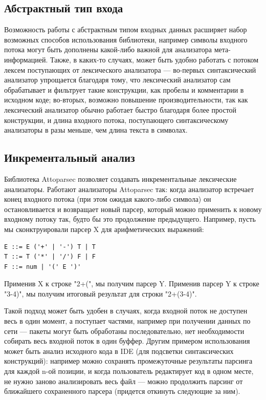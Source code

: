 \documentclass[14pt]{matmex-diploma}
\begin{document}
\subsection{Абстрактный тип входа}

Возможность работы с абстрактным типом входных данных расширяет набор возможных способов использования библиотеки, 
например символы входного потока могут быть дополнены какой-либо важной для анализатора мета-информацией.
Также, в каких-то случаях, может быть удобно работать с потоком лексем поступающих от лексического анализатора --- 
во-первых синтаксический анализатор упрощается благодаря тому,
что лексический анализатор сам обрабатывает и фильтрует такие конструкции, 
как пробелы и комментарии в исходном коде; во-вторых, возможно повышение 
производительности, так как лексический анализатор обычно работает 
быстро благодаря более простой конструкции, и длина входного потока, 
поступающего синтаксическому анализаторы в разы меньше, чем длина текста в символах.

\subsection{Инкрементальный анализ}
Библиотека Attoparsec позволяет создавать инкрементальные лексические 
анализаторы. Работают анализаторы Attoparsec так: когда анализатор встречает конец входного потока (при этом ожидая 
какого-либо символа) он остановливается и возвращает новый парсер, 
который можно применить к новому входному потоку так, будто бы это 
продолжение предыдущего. Например, пусть мы сконктруировали парсер X 
для арифметических выражений:
\begin{lstlisting}
E ::= E ('+' | '-') T | T
T ::= T ('*' | '/') F | F
F ::= num | '(' E ')' 
\end{lstlisting}
Применив X к строке "2+(", мы получим парсер Y. 
Применив парсер Y к строке "3-4)", мы получим итоговый результат для строки "2+(3-4)". 

Такой подход может быть удобен в случаях, когда входной поток не доступен 
весь в один момент, а поступает частями, например при получении данных по сети --- 
пакеты могут быть обработаны последовательно, нет необходимости собирать весь 
входной поток в один буффер.
Другим примером использования может быть анализ исходного кода в IDE 
(для подсветки синтаксических конструкций): например можно сохранять 
промежуточные результаты парсинга для каждой n-ой позиции, и когда 
пользователь редактирует код в одном месте, не нужно заново анализировать 
весь файл --- можно продолжить парсинг от ближайшего сохраненного 
парсера (придется откинуть следующие за ним).
\end{document}
